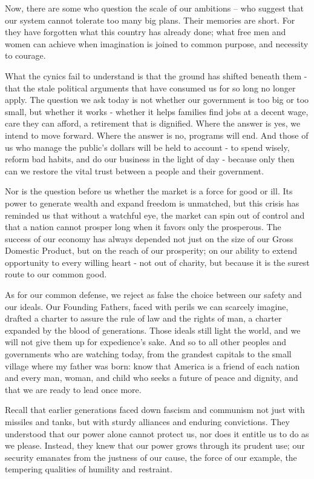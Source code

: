 {Now, there are some who question the scale of our ambitions -- who suggest that our system cannot tolerate too many big plans. Their memories are short. For they have forgotten what this country has already done; what free men and women can achieve when imagination is joined to common purpose, and necessity to courage.

What the cynics fail to understand is that the ground has shifted beneath them - that the stale political arguments that have consumed us for so long no longer apply. The question we ask today is not whether our government is too big or too small, but whether it works - whether it helps families find jobs at a decent wage, care they can afford, a retirement that is dignified. Where the answer is yes, we intend to move forward. Where the answer is no, programs will end. And those of us who manage the public's dollars will be held to account - to spend wisely, reform bad habits, and do our business in the light of day - because only then can we restore the vital trust between a people and their government.

Nor is the question before us whether the market is a force for good or ill. Its power to generate wealth and expand freedom is unmatched, but this crisis has reminded us that without a watchful eye, the market can spin out of control and that a nation cannot prosper long when it favors only the prosperous. The success of our economy has always depended not just on the size of our Gross Domestic Product, but on the reach of our prosperity; on our ability to extend opportunity to every willing heart - not out of charity, but because it is the surest route to our common good.

As for our common defense, we reject as false the choice between our safety and our ideals. Our Founding Fathers, faced with perils we can scarcely imagine, drafted a charter to assure the rule of law and the rights of man, a charter expanded by the blood of generations. Those ideals still light the world, and we will not give them up for expedience's sake. And so to all other peoples and governments who are watching today, from the grandest capitals to the small village where my father was born: know that America is a friend of each nation and every man, woman, and child who seeks a future of peace and dignity, and that we are ready to lead once more.

Recall that earlier generations faced down fascism and communism not just with missiles and tanks, but with sturdy alliances and enduring convictions. They understood that our power alone cannot protect us, nor does it entitle us to do as we please. Instead, they knew that our power grows through its prudent use; our security emanates from the justness of our cause, the force of our example, the tempering qualities of humility and restraint.

}
